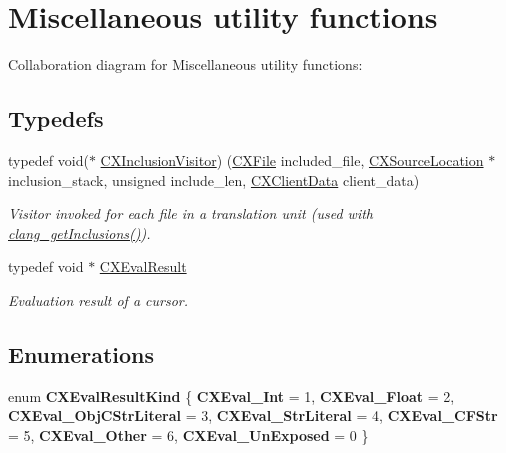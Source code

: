 \hypertarget{group__CINDEX__MISC}{}\section{Miscellaneous utility functions}
\label{group__CINDEX__MISC}
Collaboration diagram for Miscellaneous utility functions\+:
\subsection*{Typedefs}
\begin{DoxyCompactItemize}
\item 
typedef void($\ast$ \hyperlink{group__CINDEX__MISC_ga075c50e5cf912f15d902cff864ea7d13}{C\+X\+Inclusion\+Visitor}) (\hyperlink{group__CINDEX__FILES_gacfcea9c1239c916597e2e5b3e109215a}{C\+X\+File} included\+\_\+file, \hyperlink{structCXSourceLocation}{C\+X\+Source\+Location} $\ast$inclusion\+\_\+stack, unsigned include\+\_\+len, \hyperlink{group__CINDEX_gacfa40c3de26d228c0d898403c2c21612}{C\+X\+Client\+Data} client\+\_\+data)
\begin{DoxyCompactList}\small\item\em Visitor invoked for each file in a translation unit (used with \hyperlink{group__CINDEX__MISC_ga4363bd8c203ca2b5dfc23c5765695d60}{clang\+\_\+get\+Inclusions()}). \end{DoxyCompactList}\item 
\mbox{\label{group__CINDEX__MISC_gaa9270afc68877e1f3b20ce5b343191bc}} 
typedef void $\ast$ \hyperlink{group__CINDEX__MISC_gaa9270afc68877e1f3b20ce5b343191bc}{C\+X\+Eval\+Result}
\begin{DoxyCompactList}\small\item\em Evaluation result of a cursor. \end{DoxyCompactList}\end{DoxyCompactItemize}
\subsection*{Enumerations}
\begin{DoxyCompactItemize}
\item 
\mbox{\label{group__CINDEX__MISC_ga71ffcbb614704d05b059e7edce9465fe}} 
enum {\bfseries C\+X\+Eval\+Result\+Kind} \{ \newline
{\bfseries C\+X\+Eval\+\_\+\+Int} = 1, 
{\bfseries C\+X\+Eval\+\_\+\+Float} = 2, 
{\bfseries C\+X\+Eval\+\_\+\+Obj\+C\+Str\+Literal} = 3, 
{\bfseries C\+X\+Eval\+\_\+\+Str\+Literal} = 4, 
\newline
{\bfseries C\+X\+Eval\+\_\+\+C\+F\+Str} = 5, 
{\bfseries C\+X\+Eval\+\_\+\+Other} = 6, 
{\bfseries C\+X\+Eval\+\_\+\+Un\+Exposed} = 0
 \}
\end{DoxyCompactItemize}
